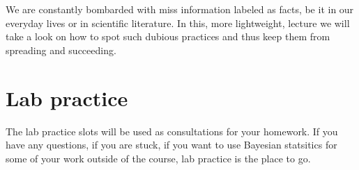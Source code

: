 \documentclass[fleqn,moreauthors,10pt]{ds_report}
\begin{document}
We are constantly bombarded with miss information labeled as facts, be it in our everyday lives or in scientific literature. In this, more lightweight, lecture we will take a look on how to spot such dubious practices and thus keep them from spreading and succeeding.

\section*{Lab practice}

The lab practice slots will be used as consultations for your homework. If you have any questions, if you are stuck, if you want to use Bayesian statsitics for some of your work outside of the course, lab practice is the place to go.
\end{document}
